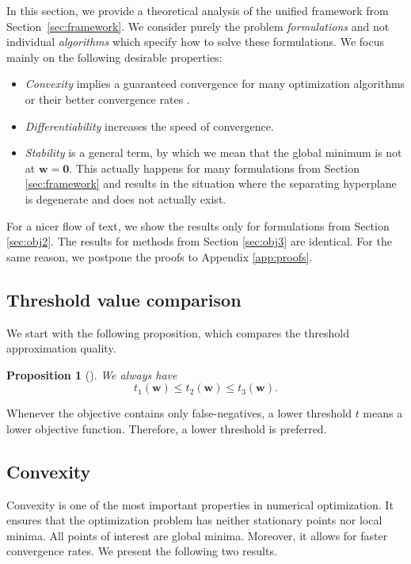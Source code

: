 \documentclass[]{interact}
\theoremstyle{plain}%
\newtheorem{proposition}[theorem]{Proposition}
\theoremstyle{definition}
\theoremstyle{remark}
\begin{document}
In this section, we provide a theoretical analysis of the unified framework from Section~\ref{sec:framework}. We consider purely the problem \textit{formulations} and not individual \textit{algorithms} which specify how to solve these formulations. We focus mainly on the following desirable properties:
\begin{itemize}\itemsep 0pt
  \item \textit{Convexity} implies a guaranteed convergence for many optimization algorithms or their better convergence rates \citep{boyd.2004}.
  \item \textit{Differentiability} increases the speed of convergence.
  \item \textit{Stability} is a general term, by which we mean that the global minimum is not at $\bm w=\bm 0$. This actually happens for many formulations from Section \ref{sec:framework} and results in the situation where the separating hyperplane is degenerate and does not actually exist.
\end{itemize}
For a nicer flow of text, we show the results only for formulations from Section \ref{sec:obj2}. The results for methods from Section \ref{sec:obj3} are identical. For the same reason, we postpone the proofs to Appendix \ref{app:proofs}.


\subsection{Threshold value comparison}

We start with the following proposition, which compares the threshold approximation quality.

\begin{proposition}[\cite{zhang2018tau}]\label{prop:threholds}
  We always have
  $$
    t_1(\bm w) \le t_2(\bm w) \le t_3(\bm w).
  $$  
\end{proposition}

\noindent Whenever the objective contains only false-negatives, a lower threshold $t$ means a lower objective function. Therefore, a lower threshold is preferred.


\subsection{Convexity}\label{sec:convexity}

Convexity is one of the most important properties in numerical optimization. It ensures that the optimization problem has neither stationary points nor local minima. All points of interest are global minima. Moreover, it allows for faster convergence rates. We present the following two results.
\end{document}
